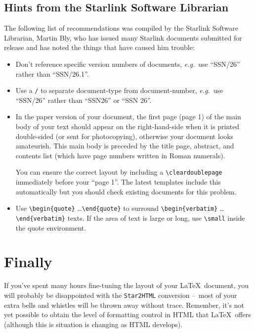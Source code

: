 \documentclass[twoside,11pt]{article}
\newcommand{\xlabel}[1]{}
\renewcommand{\_}{\texttt{\symbol{95}}}
\newcommand{\dash}{--}
\newcommand{\dash}{-}
\begin{document}
\subsection{\xlabel{hints_from_the_starlink_software_librarian}Hints from the Starlink Software Librarian}

The following list of recommendations was compiled by the Starlink Software
Librarian, Martin Bly, who has issued many Starlink documents submitted for
release and has noted the things that have caused him trouble:

\begin{itemize}

\item Don't reference specific version numbers of documents, \textit{e.g.}\ use
``SSN/26'' rather than ``SSN/26.1''.

\item Use a \verb+/+ to separate document-type from
document-number, \textit{e.g.}\ use ``SSN/26'' rather than ``SSN26'' or
``SSN 26''.

\item In the paper version of your document, the first page (page 1)
of the main body of your text should appear on the right-hand-side
when it is printed double-sided (or sent for photocopying), otherwise
your document looks amateurish.  This main body is preceded by the
title page, abstract, and contents list (which have page numbers
written in Roman numerals).

You can ensure the correct layout by including a \verb+\cleardoublepage+
immediately before your ``page 1''.
The latest templates include this automatically but you should check existing
documents for this problem.

\item Use \verb+\begin{quote}+ \ldots \verb+\end{quote}+ to surround
\verb+\+\verb+begin{verbatim}+ \ldots \verb+\+\verb+end{verbatim}+ texts.
If the area of text is large or long, use \verb+\small+ inside the quote
environment.

\end{itemize}

\section{\xlabel{finally}Finally}

If you've spent many hours fine-tuning the layout of your \LaTeX\
document, you will probably be disappointed with the
\texttt{Star2HTML} conversion \dash\ most of your extra bells and
whistles will be thrown away without trace.  Remember, it's not yet
possible to obtain the level of formatting control in HTML that
\LaTeX\ offers (although this is situation is changing as HTML
develops).
\end{document}
